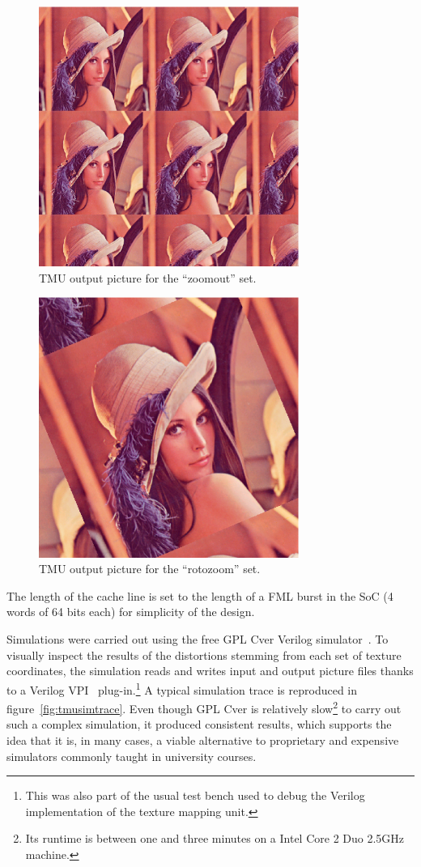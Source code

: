 \documentclass[a4paper,11pt]{kthesis}
\begin{document}
\begin{figure}[htp]
\centering
\includegraphics[height=85mm]{tmuout_zoomout.eps}
\caption{TMU output picture for the ``zoomout'' set.}
\label{fig:tmuoutzoomout}
\end{figure}

\begin{figure}[htp]
\centering
\includegraphics[height=85mm]{tmuout_rotozoom.eps}
\caption{TMU output picture for the ``rotozoom'' set.}
\label{fig:tmuoutrotozoom}
\end{figure}

The length of the cache line is set to the length of a FML burst in the SoC (4 words of 64 bits each) for simplicity of the design.

Simulations were carried out using the free GPL Cver Verilog simulator~\cite{gplcver}. To visually inspect the results of the distortions stemming from each set of texture coordinates, the simulation reads and writes input and output picture files thanks to a Verilog VPI~\cite{vpi} plug-in.\footnote{This was also part of the usual test bench used to debug the Verilog implementation of the texture mapping unit.} A typical simulation trace is reproduced in figure~\ref{fig:tmusimtrace}. Even though GPL Cver is relatively slow\footnote{Its runtime is between one and three minutes on a Intel Core 2 Duo 2.5GHz machine.} to carry out such a complex simulation, it produced consistent results, which supports the idea that it is, in many cases, a viable alternative to proprietary and expensive simulators commonly taught in university courses.
\end{document}
